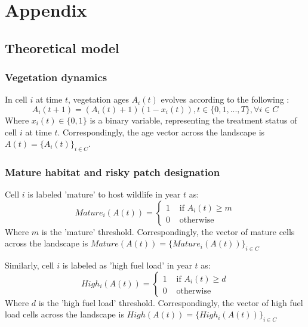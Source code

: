 \section{Appendix}
\subsection{Theoretical model}
\label{sec:appendix_wildland__theoretical}
\subsubsection{Vegetation dynamics}
In cell $i$ at time $t$, vegetation ages $A_i(t)$ evolves according to the following :
\begin{equation}
    A_i(t+1) = (A_i(t) + 1)(1-x_i(t)), t\in \{0,1,..., T\}, \forall i \in C
\label{eq:fuel_dyn}
\end{equation}
Where $x_i(t)\in \{0,1\}$ is a binary variable, representing the treatment status of cell $i$ at time $t$. Correspondingly, the age vector across the landscape is $A(t)=\{A_i(t)\}_{i\in C}$.

\subsubsection{Mature habitat and risky patch designation}
Cell $i$ is labeled 'mature' to host wildlife in year $t$ as:
\begin{equation}
    Mature_i\left(A(t)\right) = \begin{cases}
        1 &\text{ if } A_i(t) \geq m\\
        0 &\text{ otherwise }
    \end{cases}
\label{eq:mature}
\end{equation}
Where $m$ is the 'mature' threshold. Correspondingly, the vector of mature cells across the landscape is $Mature\left(A(t)\right)=\{Mature_i\left(A(t)\right)\}_{i\in C}$

Similarly, cell $i$ is labeled as 'high fuel load' in year $t$ as:
\begin{equation}
    High_i\left(A(t)\right) = \begin{cases}
1 &\text{ if } A_i(t)\geq d\\
0 &\text{ otherwise}
    \end{cases}
\label{eq:high_fuel}
\end{equation}
Where $d$ is the 'high fuel load' threshold. Correspondingly, the vector of high fuel load cells across the landscape is $High\left(A(t)\right)=\{High_i\left(A(t)\right)\}_{i\in C}$

